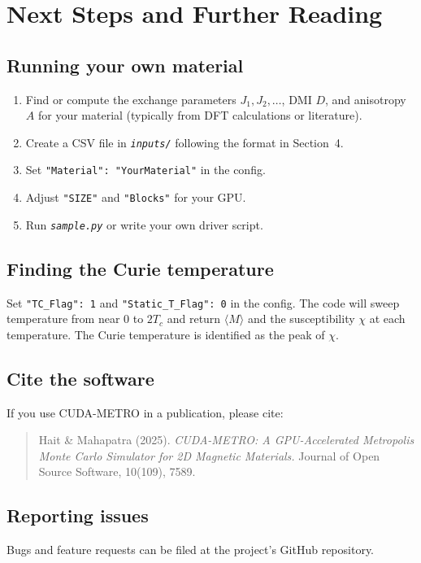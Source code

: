 \documentclass[12pt,a4paper]{article}
\newcommand{\code}[1]{\texttt{#1}}
\newcommand{\file}[1]{\texttt{\textit{#1}}}
\begin{document}
\section{Next Steps and Further Reading}

\subsection{Running your own material}

\begin{enumerate}
  \item Find or compute the exchange parameters $J_1, J_2, \ldots$, DMI $D$,
        and anisotropy $A$ for your material (typically from DFT calculations
        or literature).
  \item Create a CSV file in \file{inputs/} following the format in
        Section~4.
  \item Set \code{"Material": "YourMaterial"} in the config.
  \item Adjust \code{"SIZE"} and \code{"Blocks"} for your GPU.
  \item Run \file{sample.py} or write your own driver script.
\end{enumerate}

\subsection{Finding the Curie temperature}

Set \code{"TC\_Flag": 1} and \code{"Static\_T\_Flag": 0} in the config. The
code will sweep temperature from near 0 to $2 T_c$ and return $\langle M \rangle$
and the susceptibility $\chi$ at each temperature. The Curie temperature is
identified as the peak of $\chi$.

\subsection{Cite the software}

If you use CUDA-METRO in a publication, please cite:

\begin{quote}
Hait \& Mahapatra (2025). \textit{CUDA-METRO: A GPU-Accelerated Metropolis
Monte Carlo Simulator for 2D Magnetic Materials.} Journal of Open Source
Software, 10(109), 7589.
\end{quote}

\subsection{Reporting issues}

Bugs and feature requests can be filed at the project's GitHub repository.
\end{document}
